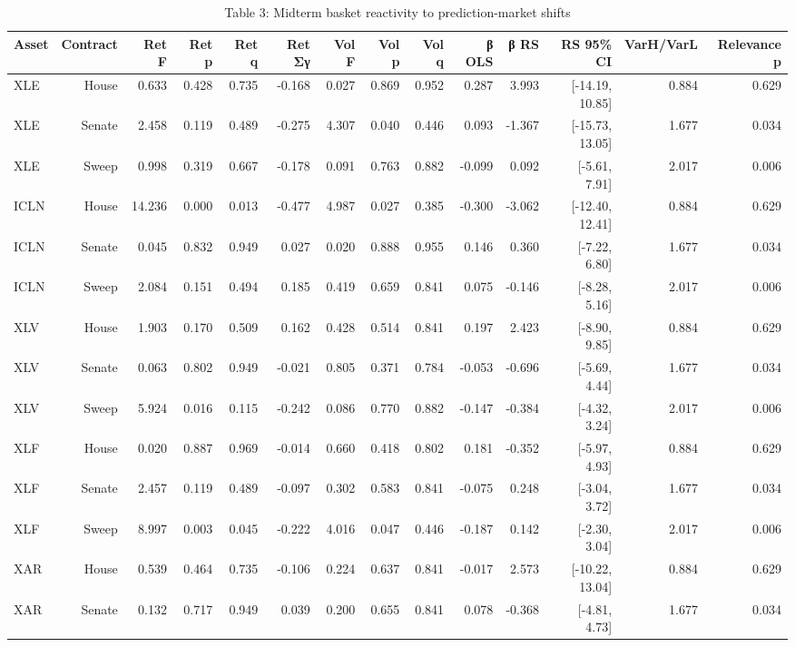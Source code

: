 \begin{table}[htbp]
\centering
\caption{Table 3: Midterm basket reactivity to prediction-market shifts}
\label{tab:table3_basket_reactivity}
\small
\begin{tabular}{lrrrrrrrrrrrrr}
\toprule
Asset & Contract & Ret F & Ret p & Ret q & Ret Σγ & Vol F & Vol p & Vol q & β OLS & β RS & RS 95\% CI & VarH/VarL & Relevance p \\
\midrule
XLE & House & 0.633 & 0.428 & 0.735 & -0.168 & 0.027 & 0.869 & 0.952 & 0.287 & 3.993 & [-14.19, 10.85] & 0.884 & 0.629 \\
XLE & Senate & 2.458 & 0.119 & 0.489 & -0.275 & 4.307 & 0.040 & 0.446 & 0.093 & -1.367 & [-15.73, 13.05] & 1.677 & 0.034 \\
XLE & Sweep & 0.998 & 0.319 & 0.667 & -0.178 & 0.091 & 0.763 & 0.882 & -0.099 & 0.092 & [-5.61, 7.91] & 2.017 & 0.006 \\
ICLN & House & 14.236 & 0.000 & 0.013 & -0.477 & 4.987 & 0.027 & 0.385 & -0.300 & -3.062 & [-12.40, 12.41] & 0.884 & 0.629 \\
ICLN & Senate & 0.045 & 0.832 & 0.949 & 0.027 & 0.020 & 0.888 & 0.955 & 0.146 & 0.360 & [-7.22, 6.80] & 1.677 & 0.034 \\
ICLN & Sweep & 2.084 & 0.151 & 0.494 & 0.185 & 0.419 & 0.659 & 0.841 & 0.075 & -0.146 & [-8.28, 5.16] & 2.017 & 0.006 \\
XLV & House & 1.903 & 0.170 & 0.509 & 0.162 & 0.428 & 0.514 & 0.841 & 0.197 & 2.423 & [-8.90, 9.85] & 0.884 & 0.629 \\
XLV & Senate & 0.063 & 0.802 & 0.949 & -0.021 & 0.805 & 0.371 & 0.784 & -0.053 & -0.696 & [-5.69, 4.44] & 1.677 & 0.034 \\
XLV & Sweep & 5.924 & 0.016 & 0.115 & -0.242 & 0.086 & 0.770 & 0.882 & -0.147 & -0.384 & [-4.32, 3.24] & 2.017 & 0.006 \\
XLF & House & 0.020 & 0.887 & 0.969 & -0.014 & 0.660 & 0.418 & 0.802 & 0.181 & -0.352 & [-5.97, 4.93] & 0.884 & 0.629 \\
XLF & Senate & 2.457 & 0.119 & 0.489 & -0.097 & 0.302 & 0.583 & 0.841 & -0.075 & 0.248 & [-3.04, 3.72] & 1.677 & 0.034 \\
XLF & Sweep & 8.997 & 0.003 & 0.045 & -0.222 & 4.016 & 0.047 & 0.446 & -0.187 & 0.142 & [-2.30, 3.04] & 2.017 & 0.006 \\
XAR & House & 0.539 & 0.464 & 0.735 & -0.106 & 0.224 & 0.637 & 0.841 & -0.017 & 2.573 & [-10.22, 13.04] & 0.884 & 0.629 \\
XAR & Senate & 0.132 & 0.717 & 0.949 & 0.039 & 0.200 & 0.655 & 0.841 & 0.078 & -0.368 & [-4.81, 4.73] & 1.677 & 0.034 \\

\end{tabular}
\end{table}
